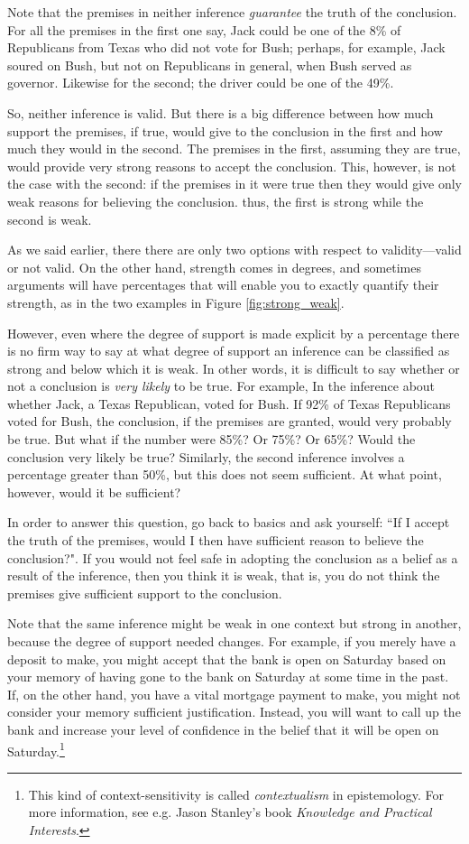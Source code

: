 Note that the premises in neither inference \textit{guarantee} the truth of the conclusion. For all the premises in the first one say, Jack could be one of the 8\% of Republicans from Texas who did not vote for Bush; perhaps, for example, Jack soured on Bush, but not on Republicans in general, when Bush served as governor. Likewise for the second; the driver could be one of the 49\%.

So, neither inference is valid. But there is a big difference between how much support the premises, if true, would give to the conclusion in the first and how much they would in the second. The premises in the first, assuming they are true, would provide very strong reasons to accept the conclusion. This, however, is not the case with the second: if the premises in it were true then they would give only weak reasons for believing the conclusion. thus, the first is strong while the second is weak.

As we said earlier, there there are only two options with respect to validity---valid or not valid. On the other hand, strength comes in degrees, and sometimes arguments will have percentages that will enable you to exactly quantify their strength, as in the two examples in Figure \ref{fig:strong_weak}.

However, even where the degree of support is made explicit by a percentage there is no firm way to say at what degree of support an inference can be classified as strong and below which it is weak. In other words, it is difficult to say whether or not a conclusion is \emph{very likely} to be true. For example, In the inference about whether Jack, a Texas Republican, voted for Bush. If 92\% of Texas Republicans voted for Bush, the conclusion, if the premises are granted, would very probably be true. But what if the number were 85\%? Or 75\%? Or 65\%? Would the conclusion very likely be true? Similarly, the second inference involves a percentage greater than 50\%, but this does not seem sufficient. At what point, however, would it be sufficient?

In order to answer this question, go back to basics and ask yourself: ``If I accept the truth of the premises, would I then have sufficient reason to believe the conclusion?". If you would not feel safe in adopting the conclusion as a belief as a result of the inference, then you think it is weak, that is, you do not think the premises give sufficient support to the conclusion.

Note that the same inference might be weak in one context but strong in another, because the degree of support needed changes. For example, if you merely have a deposit to make, you might accept that the bank is open on Saturday based on your memory of having gone to the bank on Saturday at some time in the past. If, on the other hand, you have a vital mortgage payment to make, you might not consider your memory sufficient justification. Instead, you will want to call up the bank and increase your level of confidence in the belief that it will be open on Saturday.\footnote{This kind of context-sensitivity is called \emph{contextualism} in epistemology. For more information, see e.g. Jason Stanley's book \textit{Knowledge and Practical Interests}.}

